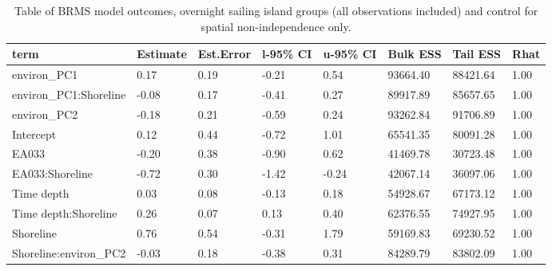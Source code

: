 \begin{table}[ht]
\centering
\begin{tabular}{p{3cm}p{1.35cm}p{1.35cm}p{1.35cm}p{1.35cm}p{1.35cm}p{1.35cm}p{1.35cm}}
  \toprule
term & Estimate & Est.Error & l-95\% CI & u-95\% CI & Bulk ESS & Tail ESS & Rhat \\ 
  \midrule
environ\_PC1 & 0.17 & 0.19 & -0.21 & 0.54 & 93664.40 & 88421.64 & 1.00 \\ 
  environ\_PC1:Shoreline & -0.08 & 0.17 & -0.41 & 0.27 & 89917.89 & 85657.65 & 1.00 \\ 
  environ\_PC2 & -0.18 & 0.21 & -0.59 & 0.24 & 93262.84 & 91706.89 & 1.00 \\ 
  Intercept & 0.12 & 0.44 & -0.72 & 1.01 & 65541.35 & 80091.28 & 1.00 \\ 
  EA033 & -0.20 & 0.38 & -0.90 & 0.62 & 41469.78 & 30723.48 & 1.00 \\ 
  EA033:Shoreline & -0.72 & 0.30 & -1.42 & -0.24 & 42067.14 & 36097.06 & 1.00 \\ 
  Time depth & 0.03 & 0.08 & -0.13 & 0.18 & 54928.67 & 67173.12 & 1.00 \\ 
  Time depth:Shoreline & 0.26 & 0.07 & 0.13 & 0.40 & 62376.55 & 74927.95 & 1.00 \\ 
  Shoreline & 0.76 & 0.54 & -0.31 & 1.79 & 59169.83 & 69230.52 & 1.00 \\ 
  Shoreline:environ\_PC2 & -0.03 & 0.18 & -0.38 & 0.31 & 84289.79 & 83802.09 & 1.00 \\ 
   \bottomrule
\end{tabular}
\caption{Table of BRMS model outcomes, overnight sailing island groups (all observations included) and control for spatial non-independence only.} 
\label{BRMS_effects_SBZR_control_spatial}
\end{table}
